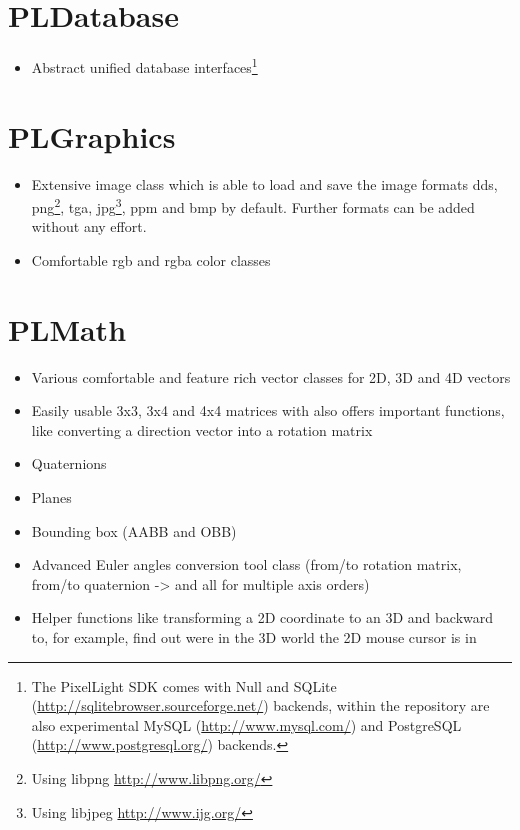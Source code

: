 \section{PLDatabase}
\begin{itemize}
\item{Abstract unified database interfaces\footnote{The PixelLight SDK comes with Null and SQLite (\url{http://sqlitebrowser.sourceforge.net/}) backends, within the repository are also experimental MySQL (\url{http://www.mysql.com/}) and PostgreSQL (\url{http://www.postgresql.org/}) backends.}}
\end{itemize}




\section{PLGraphics}
\begin{itemize}
\item{Extensive image class which is able to load and save the image formats dds, png\footnote{Using libpng \url{http://www.libpng.org/}}, tga, jpg\footnote{Using libjpeg \url{http://www.ijg.org/}}, ppm and bmp by default. Further formats can be added without any effort.}
\item{Comfortable rgb and rgba color classes}
\end{itemize}




\section{PLMath}
\begin{itemize}
\item{Various comfortable and feature rich vector classes for 2D, 3D and 4D vectors}
\item{Easily usable 3x3, 3x4 and 4x4 matrices with also offers important functions, like converting a direction vector into a rotation matrix}
\item{Quaternions}
\item{Planes}
\item{Bounding box (AABB and OBB)}
\item{Advanced Euler angles conversion tool class (from/to rotation matrix, from/to quaternion -> and all for multiple axis orders)}
\item{Helper functions like transforming a 2D coordinate to an 3D and backward to, for example, find out were in the 3D world the 2D mouse cursor is in}
\end{itemize}
